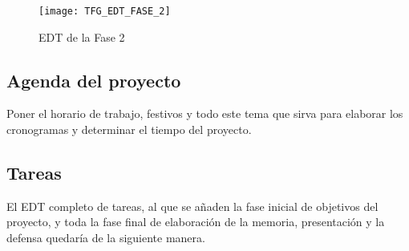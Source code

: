 \begin{figure}[H]
	\centering
	\texttt{[image: TFG\_EDT\_FASE\_2]}
	\caption{EDT de la Fase 2}
	\label{fig:edt2}
\end{figure}

\subsection{Agenda del proyecto}
{\color{red} Poner el horario de trabajo, festivos y todo este tema que sirva para elaborar los cronogramas y determinar el tiempo del proyecto.}

\subsection{Tareas}
El EDT completo de tareas, al que se añaden la fase inicial de objetivos del proyecto, y toda la fase final de elaboración de la memoria, presentación y la defensa quedaría de la siguiente manera.
